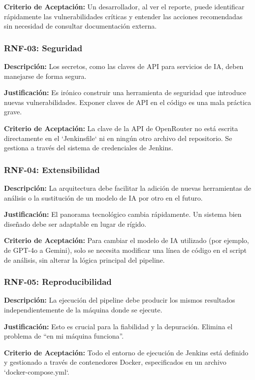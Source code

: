 \textbf{Criterio de Aceptación:} Un desarrollador, al ver el reporte, puede identificar rápidamente las vulnerabilidades críticas y entender las acciones recomendadas sin necesidad de consultar documentación externa.

\subsubsection{RNF-03: Seguridad}

\textbf{Descripción:} Los secretos, como las claves de API para servicios de IA, deben manejarse de forma segura.

\textbf{Justificación:} Es irónico construir una herramienta de seguridad que introduce nuevas vulnerabilidades. Exponer claves de API en el código es una mala práctica grave.

\textbf{Criterio de Aceptación:} La clave de la API de OpenRouter no está escrita directamente en el `Jenkinsfile` ni en ningún otro archivo del repositorio. Se gestiona a través del sistema de credenciales de Jenkins.

\subsubsection{RNF-04: Extensibilidad}

\textbf{Descripción:} La arquitectura debe facilitar la adición de nuevas herramientas de análisis o la sustitución de un modelo de IA por otro en el futuro.

\textbf{Justificación:} El panorama tecnológico cambia rápidamente. Un sistema bien diseñado debe ser adaptable en lugar de rígido.

\textbf{Criterio de Aceptación:} Para cambiar el modelo de IA utilizado (por ejemplo, de GPT-4o a Gemini), solo se necesita modificar una línea de código en el script de análisis, sin alterar la lógica principal del pipeline.

\subsubsection{RNF-05: Reproducibilidad}

\textbf{Descripción:} La ejecución del pipeline debe producir los mismos resultados independientemente de la máquina donde se ejecute.

\textbf{Justificación:} Esto es crucial para la fiabilidad y la depuración. Elimina el problema de ``en mi máquina funciona''.

\textbf{Criterio de Aceptación:} Todo el entorno de ejecución de Jenkins está definido y gestionado a través de contenedores Docker, especificados en un archivo `docker-compose.yml`.

